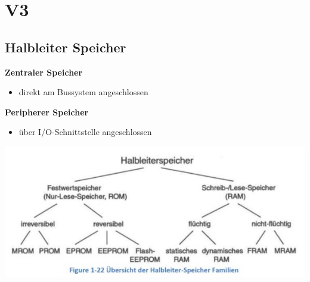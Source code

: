 \section{V3}
\subsection{Halbleiter Speicher} 
\begin{multicols}{2}
    \begin{minipage}{\linewidth}
\textbf{Zentraler Speicher}
\begin{itemize}
    \item direkt am Bussystem angeschlossen
\end{itemize}
\textbf{Peripherer Speicher}
\begin{itemize}
    \item über I/O-Schnittstelle angeschlossen
\end{itemize}
    \end{minipage}

\includegraphics[width=\linewidth]{images/halbleiterfam}
\end{multicols}

